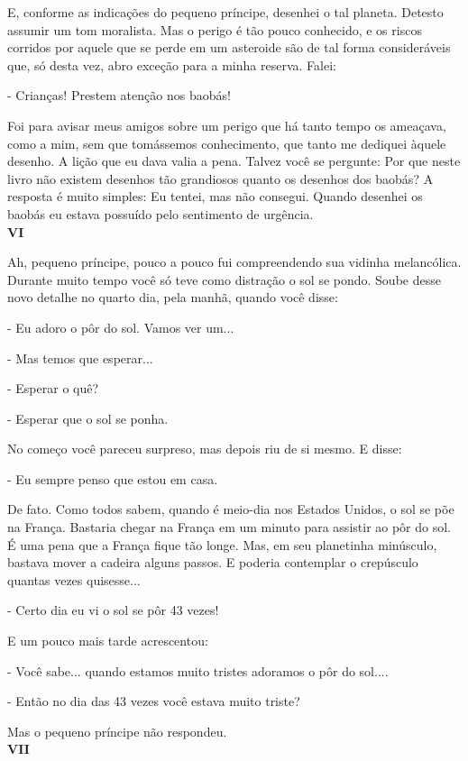 \begin{Parallel}[p]{}{}
{E, conforme as indicações do pequeno príncipe, desenhei o tal planeta.
Detesto assumir um tom moralista. Mas o perigo é tão pouco conhecido, e
os riscos corridos por aquele que se perde em um asteroide são de tal
forma consideráveis que, só desta vez, abro exceção para a minha
reserva. Falei:

- Crianças! Prestem atenção nos baobás!

Foi para avisar meus amigos sobre um perigo que há tanto tempo os
ameaçava, como a mim, sem que tomássemos conhecimento, que tanto me
dediquei àquele desenho. A lição que eu dava valia a pena. Talvez você
se pergunte: Por que neste livro não existem desenhos tão grandiosos
quanto os desenhos dos baobás? A resposta é muito simples: Eu tentei,
mas não consegui. Quando desenhei os baobás eu estava possuído pelo
sentimento de urgência.\\

\textbf{VI}

Ah, pequeno príncipe, pouco a pouco fui compreendendo sua vidinha
melancólica. Durante muito tempo você só teve como distração o sol se
pondo. Soube desse novo detalhe no quarto dia, pela manhã, quando você
disse:

- Eu adoro o pôr do sol. Vamos ver um...

- Mas temos que esperar...

- Esperar o quê?

- Esperar que o sol se ponha.

No começo você pareceu surpreso, mas depois riu de si mesmo. E disse:

- Eu sempre penso que estou em casa.

De fato. Como todos sabem, quando é meio-dia nos Estados Unidos, o sol
se põe na França. Bastaria chegar na França em um minuto para assistir
ao pôr do sol. É uma pena que a França fique tão longe. Mas, em seu
planetinha minúsculo, bastava mover a cadeira alguns passos. E poderia
contemplar o crepúsculo quantas vezes quisesse...

- Certo dia eu vi o sol se pôr 43 vezes!

E um pouco mais tarde acrescentou:

- Você sabe... quando estamos muito tristes adoramos o pôr do sol....

- Então no dia das 43 vezes você estava muito triste?

Mas o pequeno príncipe não respondeu.\\

\textbf{VII}

}
\end{Parallel}
